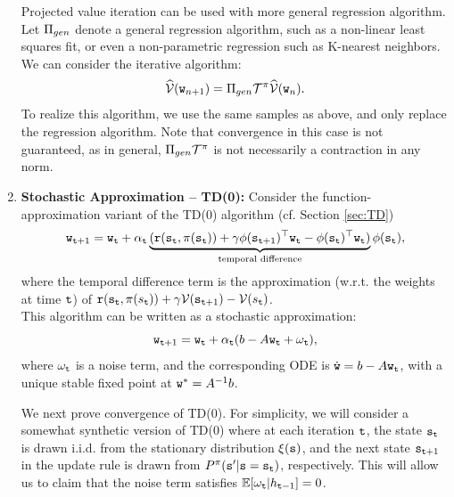 \begin{enumerate}
\begin{remark}
Projected value iteration can be used with more general regression algorithm. Let $\Pi_{gen}$ denote a general regression algorithm, such as a non-linear least squares fit, or even a non-parametric regression such as K-nearest neighbors. We can consider the iterative algorithm:
$$\widehat{\mathcal{V}}({\tt w}_{n+1}) = \Pi_{gen} \mathcal{T}^\pi \widehat{\mathcal{V}}({\tt w}_{n}).$$
To realize this algorithm, we use the same samples as above, and only replace the regression algorithm. Note that convergence in this case is not guaranteed, as in general, $\Pi_{gen} \mathcal{T}^\pi$ is not necessarily a contraction in any norm.
\end{remark}

\item \textbf{Stochastic Approximation -- TD(0):} Consider the function-approximation variant of the TD(0) algorithm (cf. Section \ref{sec:TD})
\begin{equation}\label{eq:TD_func_approx}
    {\tt w}_{{\tt t}+1} = {\tt w}_{\tt t} + \alpha_{\tt t} \underbrace{( {\tt r}({\tt s}_{\tt t},\pi({\tt s}_{\tt t})) +\gamma {\phi}({\tt s}_{{\tt t}+1})^\top {\tt w}_{\tt t} - {\phi}({\tt s}_{{\tt t}})^\top {\tt w}_{\tt t})}_{\textrm{temporal difference}} \phi({\tt s}_{{\tt t}}),
\end{equation}
where the temporal difference term is the approximation (w.r.t. the weights at time ${\tt t}$) of ${\tt r}({\tt s}_{\tt t},\pi(s_{\tt t})) +\gamma \mathcal{V}({\tt s}_{{\tt t}+1}) - \mathcal{V}(s_{\tt t})$.
\\
This algorithm can be written as a stochastic approximation:
\begin{equation*}
    {\tt w}_{{\tt t}+1} = {\tt w}_{\tt t} + \alpha_{\tt t} ( b -  A {\tt w}_{\tt t} + \omega_{\tt t} ),
\end{equation*}
where $\omega_{\tt t}$ is a noise term, and the corresponding ODE is $\dot{{\tt w}} = b -  A {\tt w}_{\tt t}$, with a unique stable fixed point at ${\tt w}^* = A^{-1}b$. 

We next prove convergence of TD(0). For simplicity, we will consider a somewhat synthetic version of TD(0) where at each iteration ${\tt t}$, the state ${\tt s}_{\tt t}$ is drawn i.i.d. from the stationary distribution $\xi({\tt s})$, and the next state ${\tt s}_{{\tt t}+1}$ in the update rule is drawn from $P^\pi({\tt s}'|{\tt s} = {\tt s}_{\tt t})$, respectively. This will allow us to claim that the noise term satisfies $\mathbb{E}[\omega_{\tt t}|h_{{\tt t}-1}]=0$. 



\end{enumerate}
